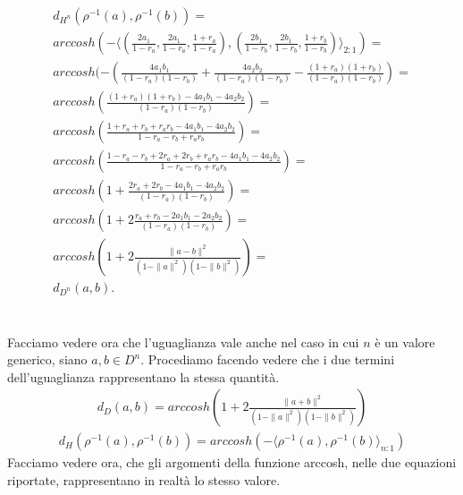 \documentclass[a4paper, 12pt]{article}
\begin{document}
\begin{equation*}\begin{gathered}
d_{H^n}(\rho^{-1}(a), \rho^{-1}(b)) = \\
arccosh(-\langle (\frac{2a_1}{1-r_a}, \frac{2a_1}{1-r_a}, \frac{1+r_a}{1-r_a}), (\frac{2b_1}{1-r_b}, \frac{2b_1}{1-r_b}, \frac{1+r_b}{1-r_b}) \rangle_{2:1}) =\\
arccosh(- (\frac{4a_1b_1}{(1-r_a)(1-r_b)} + \frac{4a_2b_2}{(1-r_a)(1-r_b)} - \frac{(1+r_a)(1+r_b)}{(1-r_a)(1-r_b)}) =\\
arccosh(\frac{(1+r_a)(1+r_b) - 4a_1b_1 - 4a_2b_2}{(1-r_a)(1-r_b)}) =\\
arccosh(\frac{1 + r_a +r_b + r_ar_b - 4a_1b_1 - 4a_2b_2}{1 - r_a - r_b + r_ar_b}) = \\
arccosh(\frac{1 -r_a -r_b + 2r_a + 2r_b + r_ar_b - 4a_1b_1 - 4a_2b_2}{1 - r_a - r_b + r_ar_b}) = \\
arccosh(1 + \frac{2r_a + 2r_b - 4a_1b_1 - 4a_2b_2}{(1-r_a)(1-r_b)}) =\\
arccosh(1 + 2 \frac{r_a + r_b - 2a_1b_1 - 2a_2b_2}{(1-r_a)(1-r_b)}) = \\
arccosh(1 + 2\frac{\parallel a - b \parallel^2}{(1 - \parallel a \parallel^2)(1 - \parallel b \parallel^2)}) =\\
d_{D^n}(a, b).
\end{gathered}\end{equation*}
\\\\
Facciamo vedere ora che l'uguaglianza vale anche nel caso in cui $n$ è un valore generico, siano $a, b \in D^n$. Procediamo facendo vedere che i due termini dell'uguaglianza rappresentano la stessa quantità.\\
\begin{equation*}\begin{gathered}
d_{D}(a,b) = arccosh(1 + 2\frac{\parallel a + b \parallel^2}{(1 - \parallel a \parallel^2)(1 - \parallel b \parallel^2)})
\end{gathered}\end{equation*}
\begin{equation*}\begin{gathered}
d_{H}(\rho^{-1}(a),\rho^{-1}(b)) = arccosh(- \langle \rho^{-1}(a),\rho^{-1}(b) \rangle_{n:1})
\end{gathered}\end{equation*}
Facciamo vedere ora, che gli argomenti della funzione arccosh, nelle due equazioni riportate, rappresentano in realtà lo stesso valore.
\end{document}
